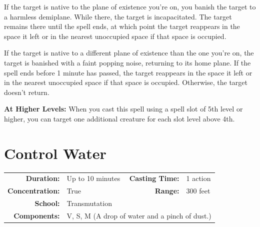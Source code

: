\documentclass[12pt,showtrims]{memoir}
\begin{document}
If the target is native to the plane of existence you're on, you banish the target to a harmless demiplane. While there, the target is incapacitated. The target remains there until the spell ends, at which point the target reappears in the space it left or in the nearest unoccupied space if that space is occupied. 

If the target is native to a different plane of existence than the one you're on, the target is banished with a faint popping noise, returning to its home plane. If the spell ends before 1 minute has passed, the target reappears in the space it left or in the nearest unoccupied space if that space is occupied. Otherwise, the target doesn't return.

\vspace{8pt} \noindent\textbf{At Higher Levels:} When you cast this spell using a spell slot of 5th level or higher, you can target one additional creature for each slot level above 4th.
\newpage
\section*{Control Water}

{
\small\centering\vspace{-6pt}
\begin{tabular}{rlrl}
\toprule

\textbf{Duration:} & Up to 10 minutes &
\textbf{Casting Time:} & 1 action \\
\textbf{Concentration:} & True &
\textbf{Range:} & 300 feet \\
\textbf{School:} & Transmutation \\
\textbf{Components:} & \multicolumn{3}{p{0.7\textwidth}}{V, S, M (A drop of water and a pinch of dust.)}\\

\bottomrule
\end{tabular}
}
\end{document}
